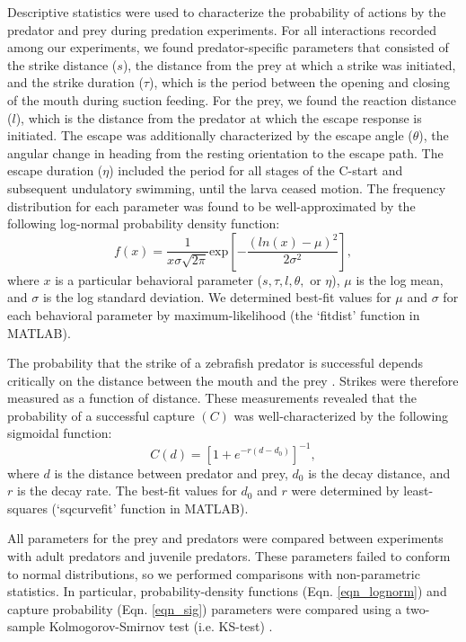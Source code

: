 \documentclass[]{rsos}%
\begin{document}
Descriptive statistics were used to characterize the probability of actions by the predator and prey during predation experiments.
For all interactions recorded among our experiments, we found predator-specific parameters that consisted of the strike distance ($s$), the distance from the prey at which a strike was initiated, and the strike duration ($\tau$), which is the period between the opening and closing of the mouth during suction feeding. 
For the prey, we found the reaction distance ($l$), which is the distance from the predator at which the escape response is initiated.
The escape was additionally characterized by the escape angle ($\theta$), the angular change in heading from the resting orientation to the escape path.
The escape duration ($\eta$) included the period for all stages of the C-start and subsequent undulatory swimming, until the larva ceased motion.
The frequency distribution for each parameter was found to be well-approximated by the following log-normal probability density function:
%
\begin{equation}%
f(x) = \frac{1}{x\sigma \sqrt{2 \pi}} \text{exp} \left[ -{\frac{(ln(x)-\mu)^2}{2\sigma ^2}} \right],
\label{eqn_lognorm}
\end{equation}
%
where $x$ is a particular behavioral parameter ($s, \tau, l, \theta ,$ or $\eta$), $\mu$ is the log mean, and $\sigma$ is the log standard deviation. 
We determined best-fit values for $\mu$ and $\sigma$ for each behavioral parameter by maximum-likelihood (the `fitdist' function in MATLAB).

The probability that the strike of a zebrafish predator is successful depends critically on the distance between the mouth and the prey \cite{Stewart:2013bha}.
Strikes were therefore measured as a function of distance. 
These measurements revealed that the probability of a successful capture $(C)$ was well-characterized by the following sigmoidal function:
%
\begin{equation}%
C(d) = \left[ 1+e^{-r(d-d_0)} \right]^{-1},
\label{eqn_sig} 
\end{equation}
%
where $d$ is the distance between predator and prey, $d_0$ is the decay distance, and $r$ is the decay rate. 
The best-fit values for $d_0$ and $r$ were determined by least-squares (`sqcurvefit' function in MATLAB).

All parameters for the prey and predators were compared between experiments with adult predators and juvenile predators.
These parameters failed to conform to normal distributions, so we performed comparisons with non-parametric statistics. 
In particular, probability-density functions (Eqn. \ref{eqn_lognorm}) and capture probability (Eqn. \ref{eqn_sig}) parameters were compared using a two-sample Kolmogorov-Smirnov test (i.e. KS-test) \cite{MasseyJr:1951jo}. 
\end{document}

